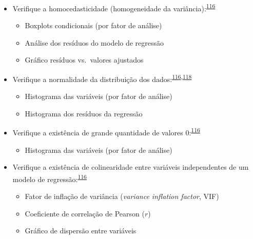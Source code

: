 \documentclass[
  a4paper,
]{book}
\providecommand{\tightlist}{%
  \setlength{\itemsep}{0pt}\setlength{\parskip}{0pt}}
\begin{document}
\begin{itemize}
\item
  Verifique a homocedasticidade (homogeneidade da variância):\textsuperscript{\protect\hyperlink{ref-zuur2009}{116}}

  \begin{itemize}
  \item
    Boxplots condicionais (por fator de análise)
  \item
    Análise dos resíduos do modelo de regressão
  \item
    Gráfico resíduos vs.~valores ajustados
  \end{itemize}
\end{itemize}

\begin{itemize}
\item
  Verifique a normalidade da distribuição dos dados:\textsuperscript{\protect\hyperlink{ref-zuur2009}{116},\protect\hyperlink{ref-chatfield1986}{118}}

  \begin{itemize}
  \item
    Histograma das variáveis (por fator de análise)
  \item
    Histograma dos resíduos da regressão
  \end{itemize}
\end{itemize}

\begin{itemize}
\item
  Verifique a existência de grande quantidade de valores 0:\textsuperscript{\protect\hyperlink{ref-zuur2009}{116}}

  \begin{itemize}
  \tightlist
  \item
    Histograma das variáveis (por fator de análise)
  \end{itemize}
\end{itemize}

\begin{itemize}
\item
  Verifique a existência de colinearidade entre variáveis independentes de um modelo de regressão:\textsuperscript{\protect\hyperlink{ref-zuur2009}{116}}

  \begin{itemize}
  \item
    Fator de inflação de variância (\emph{variance inflation factor}, VIF)
  \item
    Coeficiente de correlação de Pearson (\(r\))
  \item
    Gráfico de dispersão entre variáveis
  \end{itemize}
\end{itemize}
\end{document}
